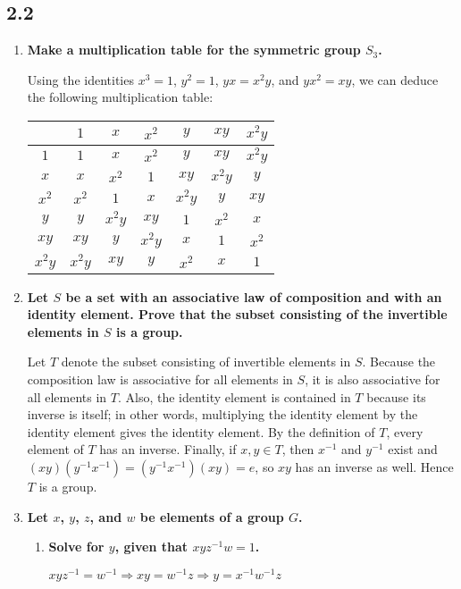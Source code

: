 \documentclass[a4paper,12pt]{article}
\begin{document}
\subsection*{2.2}
\begin{enumerate}
    \item
        \boldmath
        \textbf{Make a multiplication table for the symmetric group $S_3$.} \par
        \unboldmath
        Using the identities $x^3 = 1$, $y^2 = 1$, $yx = x^2y$, and $yx^2 = xy$, we can deduce the following multiplication table: \\
        \begin{tabular}{c | c c c c c c}
                & $1$ & $x$ & $x^2$ & $y$ & $xy$ & $x^2y$ \\
            \hline
            $1$ & $1$ & $x$ & $x^2$ & $y$ & $xy$ & $x^2y$ \\
            $x$ & $x$ & $x^2$ & $1$ & $xy$ & $x^2y$ & $y$ \\
            $x^2$ & $x^2$ & $1$ & $x$ & $x^2y$ & $y$ & $xy$ \\
            $y$ & $y$ & $x^2y$ & $xy$ & $1$ & $x^2$ & $x$ \\
            $xy$ & $xy$ & $y$ & $x^2y$ & $x$ & $1$ & $x^2$ \\
            $x^2y$ & $x^2y$ & $xy$ & $y$ & $x^2$ & $x$ & $1$
        \end{tabular}

    \item
        \boldmath
        \textbf{Let $S$ be a set with an associative law of composition and with an identity element. Prove that the subset consisting of the invertible elements in $S$ is a group.} \par
        \unboldmath
        Let $T$ denote the subset consisting of invertible elements in $S$. Because the composition law is associative for all elements in $S$, it is also associative for all elements in $T$. Also, the identity element is contained in $T$ because its inverse is itself; in other words, multiplying the identity element by the identity element gives the identity element. By the definition of $T$, every element of $T$ has an inverse. Finally, if $x, y \in T$, then $x^{-1}$ and $y^{-1}$ exist and $(xy) \left( y^{-1} x^{-1} \right) = \left( y^{-1} x^{-1} \right)(xy) = e$, so $xy$ has an inverse as well. Hence $T$ is a group.

    \item
        \boldmath
        \textbf{Let $x$, $y$, $z$, and $w$ be elements of a group $G$.} \par
        \unboldmath
        \begin{enumerate}
            \item
                \boldmath
                \textbf{Solve for $y$, given that $xyz^{-1}w = 1$.} \par
                \unboldmath
                $xyz^{-1} = w^{-1} \Rightarrow xy = w^{-1}z \Rightarrow y = x^{-1} w^{-1} z$


\end{enumerate}
\end{enumerate}
\end{document}
